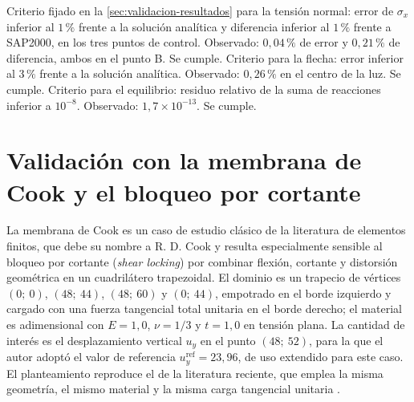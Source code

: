 Criterio fijado en la \autoref{sec:validacion-resultados} para la tensión normal: error de $\sigma_x$ inferior al $1\,\%$ frente a la solución analítica y diferencia inferior al $1\,\%$ frente a SAP2000, en los tres puntos de control. Observado: $0{,}04\,\%$ de error y $0{,}21\,\%$ de diferencia, ambos en el punto B. Se cumple. Criterio para la flecha: error inferior al $3\,\%$ frente a la solución analítica. Observado: $0{,}26\,\%$ en el centro de la luz. Se cumple. Criterio para el equilibrio: residuo relativo de la suma de reacciones inferior a $10^{-8}$. Observado: $1{,}7\times10^{-13}$. Se cumple.

\section{Validación con la membrana de Cook y el bloqueo por cortante}
\label{sec:cook}

La membrana de Cook es un caso de estudio clásico de la literatura de elementos finitos, que debe su nombre a R. D. Cook \autocite[p.~27]{stembera2019dkmq24} y resulta especialmente sensible al bloqueo por cortante (\emph{shear locking}) por combinar flexión, cortante y distorsión geométrica en un cuadrilátero trapezoidal. El dominio es un trapecio de vértices $(0;\ 0)$, $(48;\ 44)$, $(48;\ 60)$ y $(0;\ 44)$, empotrado en el borde izquierdo y cargado con una fuerza tangencial total unitaria en el borde derecho; el material es adimensional con $E = 1{,}0$, $\nu = 1/3$ y $t = 1{,}0$ en tensión plana. La cantidad de interés es el desplazamiento vertical $u_y$ en el punto $(48;\ 52)$, para la que el autor adoptó el valor de referencia $u_y^{\mathrm{ref}} = 23{,}96$, de uso extendido para este caso. El planteamiento reproduce el de la literatura reciente, que emplea la misma geometría, el mismo material y la misma carga tangencial unitaria \autocite[p.~27]{stembera2019dkmq24}.

